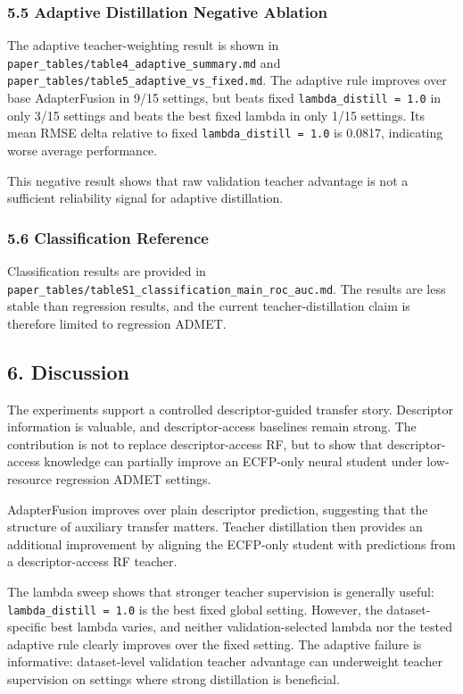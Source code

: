 \documentclass[
]{article}
\begin{document}
\subsubsection{5.5 Adaptive Distillation Negative
Ablation}\label{adaptive-distillation-negative-ablation}

The adaptive teacher-weighting result is shown in
\texttt{paper\_tables/table4\_adaptive\_summary.md} and
\texttt{paper\_tables/table5\_adaptive\_vs\_fixed.md}. The adaptive rule
improves over base AdapterFusion in 9/15 settings, but beats fixed
\texttt{lambda\_distill\ =\ 1.0} in only 3/15 settings and beats the
best fixed lambda in only 1/15 settings. Its mean RMSE delta relative to
fixed \texttt{lambda\_distill\ =\ 1.0} is 0.0817, indicating worse
average performance.

This negative result shows that raw validation teacher advantage is not
a sufficient reliability signal for adaptive distillation.

\subsubsection{5.6 Classification
Reference}\label{classification-reference}

Classification results are provided in
\texttt{paper\_tables/tableS1\_classification\_main\_roc\_auc.md}. The
results are less stable than regression results, and the current
teacher-distillation claim is therefore limited to regression ADMET.

\subsection{6. Discussion}\label{discussion}

The experiments support a controlled descriptor-guided transfer story.
Descriptor information is valuable, and descriptor-access baselines
remain strong. The contribution is not to replace descriptor-access RF,
but to show that descriptor-access knowledge can partially improve an
ECFP-only neural student under low-resource regression ADMET settings.

AdapterFusion improves over plain descriptor prediction, suggesting that
the structure of auxiliary transfer matters. Teacher distillation then
provides an additional improvement by aligning the ECFP-only student
with predictions from a descriptor-access RF teacher.

The lambda sweep shows that stronger teacher supervision is generally
useful: \texttt{lambda\_distill\ =\ 1.0} is the best fixed global
setting. However, the dataset-specific best lambda varies, and neither
validation-selected lambda nor the tested adaptive rule clearly improves
over the fixed setting. The adaptive failure is informative:
dataset-level validation teacher advantage can underweight teacher
supervision on settings where strong distillation is beneficial.
\end{document}
